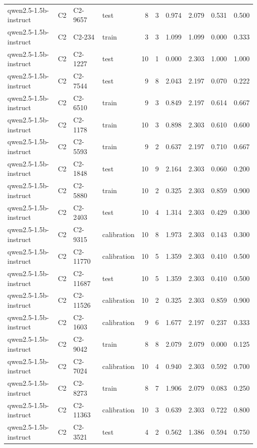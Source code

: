 \begin{table}
\begin{tabular}{llllrrrrrr}
qwen2.5-1.5b-instruct & C2 & C2-9657 & test & 8 & 3 & 0.974 & 2.079 & 0.531 & 0.500 \\
qwen2.5-1.5b-instruct & C2 & C2-234 & train & 3 & 3 & 1.099 & 1.099 & 0.000 & 0.333 \\
qwen2.5-1.5b-instruct & C2 & C2-1227 & test & 10 & 1 & 0.000 & 2.303 & 1.000 & 1.000 \\
qwen2.5-1.5b-instruct & C2 & C2-7544 & test & 9 & 8 & 2.043 & 2.197 & 0.070 & 0.222 \\
qwen2.5-1.5b-instruct & C2 & C2-6510 & train & 9 & 3 & 0.849 & 2.197 & 0.614 & 0.667 \\
qwen2.5-1.5b-instruct & C2 & C2-1178 & train & 10 & 3 & 0.898 & 2.303 & 0.610 & 0.600 \\
qwen2.5-1.5b-instruct & C2 & C2-5593 & train & 9 & 2 & 0.637 & 2.197 & 0.710 & 0.667 \\
qwen2.5-1.5b-instruct & C2 & C2-1848 & test & 10 & 9 & 2.164 & 2.303 & 0.060 & 0.200 \\
qwen2.5-1.5b-instruct & C2 & C2-5880 & train & 10 & 2 & 0.325 & 2.303 & 0.859 & 0.900 \\
qwen2.5-1.5b-instruct & C2 & C2-2403 & test & 10 & 4 & 1.314 & 2.303 & 0.429 & 0.300 \\
qwen2.5-1.5b-instruct & C2 & C2-9315 & calibration & 10 & 8 & 1.973 & 2.303 & 0.143 & 0.300 \\
qwen2.5-1.5b-instruct & C2 & C2-11770 & calibration & 10 & 5 & 1.359 & 2.303 & 0.410 & 0.500 \\
qwen2.5-1.5b-instruct & C2 & C2-11687 & test & 10 & 5 & 1.359 & 2.303 & 0.410 & 0.500 \\
qwen2.5-1.5b-instruct & C2 & C2-11526 & calibration & 10 & 2 & 0.325 & 2.303 & 0.859 & 0.900 \\
qwen2.5-1.5b-instruct & C2 & C2-1603 & calibration & 9 & 6 & 1.677 & 2.197 & 0.237 & 0.333 \\
qwen2.5-1.5b-instruct & C2 & C2-9042 & train & 8 & 8 & 2.079 & 2.079 & 0.000 & 0.125 \\
qwen2.5-1.5b-instruct & C2 & C2-7024 & calibration & 10 & 4 & 0.940 & 2.303 & 0.592 & 0.700 \\
qwen2.5-1.5b-instruct & C2 & C2-8273 & train & 8 & 7 & 1.906 & 2.079 & 0.083 & 0.250 \\
qwen2.5-1.5b-instruct & C2 & C2-11363 & calibration & 10 & 3 & 0.639 & 2.303 & 0.722 & 0.800 \\
qwen2.5-1.5b-instruct & C2 & C2-3521 & test & 4 & 2 & 0.562 & 1.386 & 0.594 & 0.750 \\

\end{tabular}
\end{table}

